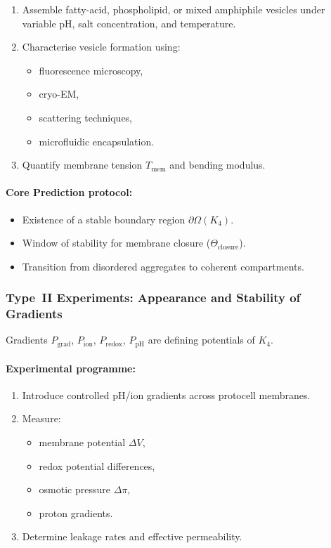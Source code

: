 \begin{enumerate}
    \item Assemble fatty-acid, phospholipid, or mixed amphiphile vesicles 
          under variable pH, salt concentration, and temperature.
    \item Characterise vesicle formation using:
          \begin{itemize}
              \item fluorescence microscopy,
              \item cryo-EM,
              \item scattering techniques,
              \item microfluidic encapsulation.
          \end{itemize}
    \item Quantify membrane tension $T_{\mathrm{mem}}$ and bending modulus.
\end{enumerate}

\paragraph{Core Prediction protocol:}

\begin{itemize}
    \item Existence of a stable boundary region $\partial\Omega(K_4)$.
    \item Window of stability for membrane closure 
          ($\Theta_{\mathrm{closure}}$).
    \item Transition from disordered aggregates to coherent compartments.
\end{itemize}



\subsubsection{Type~II Experiments: Appearance and Stability of Gradients}

Gradients $P_{\mathrm{grad}}$, $P_{\mathrm{ion}}$, 
$P_{\mathrm{redox}}$, $P_{\mathrm{pH}}$ are defining potentials of $K_4$.

\paragraph{Experimental programme:}

\begin{enumerate}
    \item Introduce controlled pH/ion gradients across protocell membranes.
    \item Measure:
          \begin{itemize}
              \item membrane potential $\Delta V$,
              \item redox potential differences,
              \item osmotic pressure $\Delta\pi$,
              \item proton gradients.
          \end{itemize}
    \item Determine leakage rates and effective permeability.
\end{enumerate}


